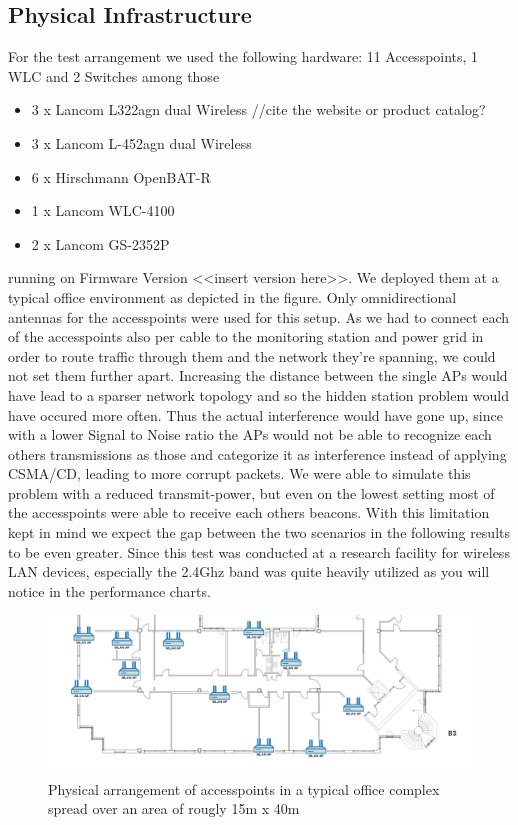   \subsection{Physical Infrastructure}
    For the test arrangement we used the following hardware:
      11 Accesspoints, 1 WLC and 2 Switches among those
      \begin{itemize}
       \item 3 x Lancom L322agn dual Wireless //cite the website or product catalog?
       \item 3 x Lancom L-452agn dual Wireless
       \item 6 x Hirschmann OpenBAT-R
       \item 1 x Lancom WLC-4100
       \item 2 x Lancom GS-2352P
      \end{itemize}
      running on Firmware Version <<insert version here>>. We deployed them at a typical office environment as depicted in the figure.
      Only omnidirectional antennas for the accesspoints were used for this setup. As we had to connect each of the accesspoints also
      per cable to the monitoring station and power grid in order to route traffic through them and the network they're spanning,
      we could not set them further apart.
      Increasing the distance between the single APs would have lead to a sparser network topology and so the hidden station problem would have occured
      more often. Thus the actual interference would have gone up, since with a lower Signal to Noise ratio the APs would not be able to recognize each others 
      transmissions as those and categorize it as interference instead of applying CSMA/CD, leading to more corrupt packets.
      We were able to simulate this problem with a reduced transmit-power,
      but even on the lowest setting most of the accesspoints were able to receive each others beacons. With this limitation kept in mind we expect
      the gap between the two scenarios in the following results to be even greater.
      Since this test was conducted at a research facility for wireless LAN devices, especially the 2.4Ghz band was quite heavily utilized as you will notice
      in the performance charts.
    \begin{figure}[t]
      \centering
      \includegraphics[width=1\columnwidth]{figures/Lancom-flur-withaps}
      \caption{Physical arrangement of accesspoints in a typical office complex spread over an area of rougly 15m x 40m}
      \label{fig:2ndfloor}
    \end{figure}
